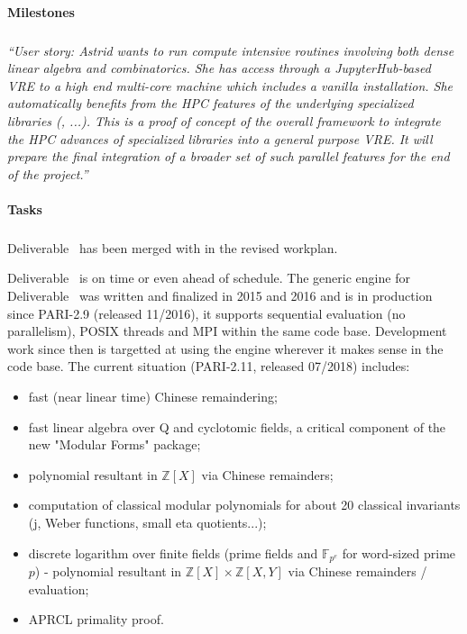 \paragraph{Milestones}

\subparagraph{}

\emph{“User story: Astrid wants to run compute intensive routines
    involving both dense linear algebra and combinatorics. She has
    access through a JupyterHub-based VRE to a high end multi-core
    machine which includes a vanilla \Sage installation. She
    automatically benefits from the HPC features of the underlying
    specialized libraries (\Linbox, ...). This is a proof of concept
    of the overall framework to integrate the HPC advances of
    specialized libraries into a general purpose VRE.
    It will prepare the final integration of a broader set of such
    parallel features for the end of the project.”}


\paragraph{Tasks}

\subparagraph{}
Deliverable~ has been merged
 with  in the revised workplan.

Deliverable~ is on time or even ahead of schedule.
The generic engine for Deliverable~ was written and
finalized in 2015 and 2016 and is in production since PARI-2.9 (released
11/2016), it supports sequential evaluation (no parallelism), POSIX threads and
MPI within the same code base.
Development work since then is targetted at using the engine wherever it makes
sense in the code base. The current situation (PARI-2.11, released 07/2018)
includes:
\begin{itemize}
\item fast (near linear time) Chinese remaindering;
\item fast linear algebra over Q and cyclotomic fields, a critical component of
the new "Modular Forms" package;
\item polynomial resultant in $\mathbb{Z}[X]$ via Chinese remainders;
\item computation of classical modular polynomials for about 20 classical
invariants (j, Weber functions, small eta quotients...);
\item discrete logarithm over finite fields (prime fields and
$\mathbb{F}_{p^e}$ for word-sized prime $p$) - polynomial resultant in
$\mathbb{Z}[X] \times \mathbb{Z}[X,Y]$ via 
Chinese remainders / evaluation;
\item APRCL primality proof.
\end{itemize}

